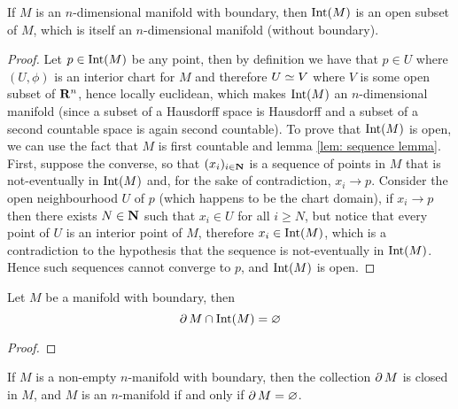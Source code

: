 \begin{proposition}\label{prop: interior is a manifold}
    If \(M\) is an \(n\)-dimensional manifold with boundary, then \(\operatorname{Int}(M)\) is
    an open subset of \(M\), which is itself an \(n\)-dimensional manifold
    (without boundary).
\end{proposition}

\begin{proof}
    Let \(p \in \operatorname{Int}(M)\) be any point, then by definition we have that \(p \in
    U\) where \((U, \phi)\) is an interior chart for \(M\) and therefore \(U \simeq
    V\) where \(V\) is some open subset of \(\mathbf{R}^n\), hence locally
    euclidean, which makes \(\operatorname{Int}(M)\) an \(n\)-dimensional manifold (since a
    subset of a Hausdorff space is Hausdorff and a subset of a second countable
    space is again second countable). To prove that \(\operatorname{Int}(M)\) is open, we can
    use the fact that \(M\) is first countable and lemma \cref{lem: sequence
        lemma}. First, suppose the converse, so that \((x_i)_{i \in \mathbf{N}}\) is a
    sequence of points in \(M\) that is not-eventually in \(\operatorname{Int}(M)\) and, for the
    sake of contradiction, \(x_i \to p\). Consider the open neighbourhood \(U\) of
    \(p\) (which happens to be the chart domain), if \(x_i \to p\) then there exists
    \(N \in \mathbf{N}\) such that \(x_i \in U\) for all \(i \geq N\), but notice that every
    point of \(U\) is an interior point of \(M\), therefore \(x_i \in \operatorname{Int}(M)\),
    which is a contradiction to the hypothesis that the sequence is not-eventually
    in \(\operatorname{Int}(M)\). Hence such sequences cannot converge to \(p\), and \(\operatorname{Int}(M)\)
    is open.
\end{proof}

\begin{theorem}\label{thm: boundary invariance}
    Let \(M\) be a manifold with boundary, then
    \[
        \operatorname{\partial} M \cap \operatorname{Int}(M) = \varnothing
    \]
\end{theorem}

\begin{proof}
\end{proof}

\begin{corollary}
    If \(M\) is a non-empty \(n\)-manifold with boundary, then the collection
    \(\operatorname{\partial} M\) is closed in \(M\), and \(M\) is an \(n\)-manifold if and only
    if \(\operatorname{\partial} M = \varnothing\).
\end{corollary}

